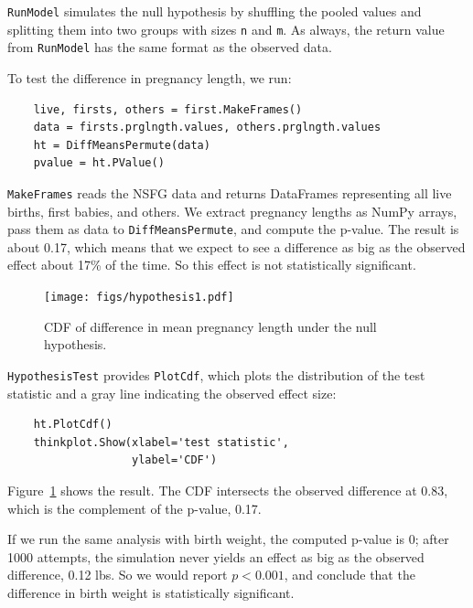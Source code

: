 \documentclass[12pt]{book}
\theoremstyle{exercise}
\begin{document}
{\tt RunModel} simulates the null hypothesis by shuffling the
pooled values and splitting them into two groups with sizes {\tt n}
and {\tt m}.  As always, the return value from {\tt RunModel} has
the same format as the observed data.%
%

To test the difference in pregnancy length, we run:

\begin{verbatim}
    live, firsts, others = first.MakeFrames()
    data = firsts.prglngth.values, others.prglngth.values
    ht = DiffMeansPermute(data)
    pvalue = ht.PValue()
\end{verbatim}

{\tt MakeFrames} reads the NSFG data and returns DataFrames
representing all live births, first babies, and others.
We extract pregnancy lengths as NumPy arrays, pass them as
data to {\tt DiffMeansPermute}, and compute the p-value.  The
result is about 0.17, which means that we expect to see a difference
as big as the observed effect about 17\% of the time.  So
this effect is not statistically significant.%
%
%
%
%

\begin{figure}
\centerline{\texttt{[image: figs/hypothesis1.pdf]}}
\caption{CDF of difference in mean pregnancy length under the null
hypothesis.}%
\label{hypothesis1}
\end{figure}

{\tt HypothesisTest} provides {\tt PlotCdf}, which plots the
distribution of the test statistic and a gray line indicating
the observed effect size:%
%
%
%

\begin{verbatim}
    ht.PlotCdf()
    thinkplot.Show(xlabel='test statistic',
                   ylabel='CDF')
\end{verbatim}

Figure~\ref{hypothesis1} shows the result.  The CDF intersects the
observed difference at 0.83, which is the complement of the p-value,
0.17.%

If we run the same analysis with birth weight, the computed p-value
is 0; after 1000 attempts,
the simulation never yields an effect
as big as the observed difference, 0.12 lbs.  So we would
report $p < 0.001$, and
conclude that the difference in birth weight is statistically
significant.%
%
%
%
\end{document}
